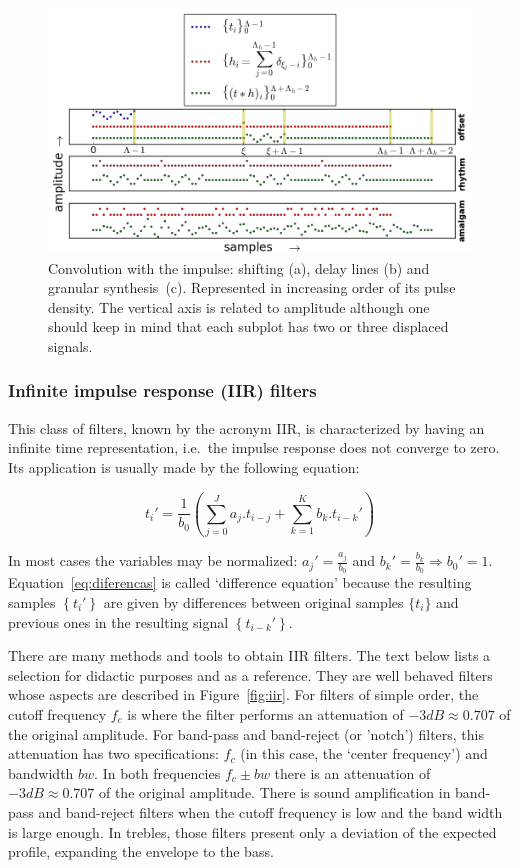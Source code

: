 \begin{figure}
    \centering
        \includegraphics[width=\textwidth]{figures/delays_}
    \caption{Convolution with the impulse: shifting (a), delay lines (b) and granular synthesis~(c). Represented in increasing order of its pulse density. The vertical axis is related to amplitude although one should keep in mind that each subplot has two or three displaced signals.}
        \label{fig:delays}
\end{figure}

\subsubsection{Infinite impulse response (IIR) filters}
This class of filters, known by the acronym IIR, is characterized by having an infinite time representation, i.e.\ the impulse response does not converge to zero. Its application is usually made by the following equation:

\begin{equation}\label{eq:diferencas}
 t_i' = \frac{1}{b_0}\left ( \sum_{j=0}^Ja_j . t_{i-j} + \sum_{k=1}^Kb_k . t_{i-k}' \right )
\end{equation}

In most cases the variables may be normalized: $a_j'=\frac{a_j}{b_0}$ and $b_k'=\frac{b_k}{b_0} \Rightarrow b_0' = 1$.
Equation~\ref{eq:diferencas} is called `difference equation' because the resulting samples $\left\{t_i'\right\}$ are given by differences between original samples $\{t_i\}$ and previous ones in the resulting signal $\left\{t_{i-k}'\right\}$.

There are many methods and tools to obtain IIR filters. The text below lists a selection for didactic purposes and as a reference. They are well behaved filters whose aspects are described in Figure~\ref{fig:iir}. For filters of simple order, the cutoff frequency $f_c$ is where the filter performs an attenuation of $-3dB \approx 0.707 $ of the original amplitude.
For band-pass and band-reject (or 'notch') filters, this attenuation has two specifications: $f_c$ (in this case, the `center frequency') and bandwidth $bw$. In both frequencies $f_c \pm bw$ there is an attenuation of $-3dB \approx 0.707$ of the original amplitude.
There is sound amplification in band-pass and band-reject filters when the cutoff frequency is low and the band width is large enough. In trebles, those filters present only a deviation of the expected profile, expanding the envelope to the bass.

